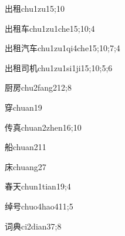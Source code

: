 \begin{verbete}{出租}{chu1zu1}{5;10}
\end{verbete}

\begin{verbete}{出租车}{chu1zu1che1}{5;10;4}
\end{verbete}

\begin{verbete}{出租汽车}{chu1zu1qi4che1}{5;10;7;4}
\end{verbete}

\begin{verbete}{出租司机}{chu1zu1si1ji1}{5;10;5;6}
\end{verbete}

\begin{verbete}{厨房}{chu2fang2}{12;8}
\end{verbete}

\begin{verbete}{穿}{chuan1}{9}
\end{verbete}

\begin{verbete}{传真}{chuan2zhen1}{6;10}
\end{verbete}

\begin{verbete}{船}{chuan2}{11}
\end{verbete}

\begin{verbete}{床}{chuang2}{7}
\end{verbete}

\begin{verbete}{春天}{chun1tian1}{9;4}
\end{verbete}

\begin{verbete}{绰号}{chuo4hao4}{11;5}
\end{verbete}

\begin{verbete}{词典}{ci2dian3}{7;8}
\end{verbete}

